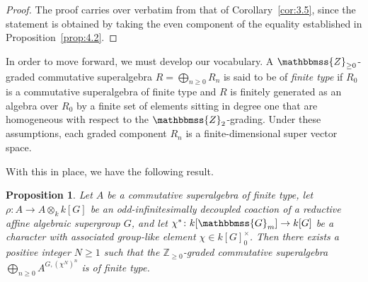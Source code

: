 \documentclass[11pt,a4paper,reqno,noamsfonts]{amsart}
\numberwithin{equation}{section}
\newtheorem{proposition}[theorem]{Proposition}
\theoremstyle{definition}
\theoremstyle{remark}
\newcommand{\GG}{\ensuremath{\mathbbmss{G}}}
\newcommand{\ZZ}{\ensuremath{\mathbbmss{Z}}}
\begin{document}
\begin{proof}
The proof carries over verbatim from that of Corollary~\ref{cor:3.5}, since the statement is obtained by taking the even component of the equality established in Proposition~\ref{prop:4.2}.
\end{proof}

In order to move forward, we must develop our vocabulary. A $\ZZ_{\ge 0}$-graded commutative superalgebra $R = \bigoplus_{n \geq 0} R_{n}$ is said to be of \emph{finite type} if $R_{0}$ is a commutative superalgebra of finite type and $R$ is finitely generated as an algebra over $R_{0}$ by a finite set of elements sitting in degree one that are homogeneous with respect to the $\ZZ_{2}$-grading. Under these assumptions, each graded component $R_{n}$ is a finite-dimensional super vector space.

With this in place, we have the following result.

\begin{proposition}\label{prop:4.4}
Let $A$ be a commutative superalgebra of finite type, let $\rho \colon A \to A \otimes_k k[G]$ be an odd-infinitesimally decoupled coaction of a reductive affine algebraic supergroup $G$, and let $\chi^{*} \colon k[\GG_m] \to k[G]$ be a character with associated group-like element $\chi \in k[G]_0^{\times}$. Then there exists a positive integer $N \geq 1$ such that the $\mathbb{Z}_{\ge 0}$-graded commutative superalgebra $\bigoplus_{n\geq 0} A^{G,(\chi^{N})^{n}}$ is of finite type.
\end{proposition}
\end{document}
